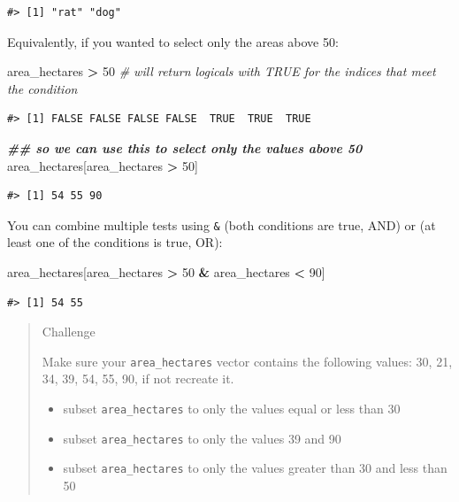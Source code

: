 \documentclass[
]{book}
\newenvironment{Shaded}{\begin{snugshade}}{\end{snugshade}}
\newcommand{\CommentTok}[1]{\textcolor[rgb]{0.56,0.35,0.01}{\textit{#1}}}
\newcommand{\DecValTok}[1]{\textcolor[rgb]{0.00,0.00,0.81}{#1}}
\newcommand{\DocumentationTok}[1]{\textcolor[rgb]{0.56,0.35,0.01}{\textbf{\textit{#1}}}}
\newcommand{\NormalTok}[1]{#1}
\newcommand{\SpecialCharTok}[1]{\textcolor[rgb]{0.81,0.36,0.00}{\textbf{#1}}}
\providecommand{\tightlist}{%
  \setlength{\itemsep}{0pt}\setlength{\parskip}{0pt}}
\begin{document}
\begin{verbatim}
#> [1] "rat" "dog"
\end{verbatim}

Equivalently, if you wanted to select only the areas above 50:

\begin{Shaded}
\begin{Highlighting}[]
\NormalTok{area\_hectares }\SpecialCharTok{\textgreater{}} \DecValTok{50}    \CommentTok{\# will return logicals with TRUE for the indices that meet the condition}
\end{Highlighting}
\end{Shaded}

\begin{verbatim}
#> [1] FALSE FALSE FALSE FALSE  TRUE  TRUE  TRUE
\end{verbatim}

\begin{Shaded}
\begin{Highlighting}[]
\DocumentationTok{\#\# so we can use this to select only the values above 50}
\NormalTok{area\_hectares[area\_hectares }\SpecialCharTok{\textgreater{}} \DecValTok{50}\NormalTok{]}
\end{Highlighting}
\end{Shaded}

\begin{verbatim}
#> [1] 54 55 90
\end{verbatim}

You can combine multiple tests using \texttt{\&} (both conditions are true, AND) or \texttt{\textbar{}}
(at least one of the conditions is true, OR):

\begin{Shaded}
\begin{Highlighting}[]
\NormalTok{area\_hectares[area\_hectares }\SpecialCharTok{\textgreater{}} \DecValTok{50} \SpecialCharTok{\&}\NormalTok{ area\_hectares }\SpecialCharTok{\textless{}} \DecValTok{90}\NormalTok{]}
\end{Highlighting}
\end{Shaded}

\begin{verbatim}
#> [1] 54 55
\end{verbatim}

\begin{quote}
Challenge

Make sure your \texttt{area\_hectares} vector contains the following values: 30, 21, 34, 39, 54, 55, 90, if not recreate it.

\begin{itemize}
\tightlist
\item
  subset \texttt{area\_hectares} to only the values equal or less than 30
\item
  subset \texttt{area\_hectares} to only the values 39 and 90
\item
  subset \texttt{area\_hectares} to only the values greater than 30 and less than 50
\end{itemize}
\end{quote}
\end{document}
